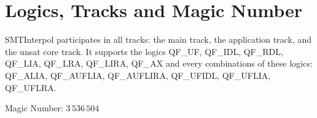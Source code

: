 \documentclass{article}
\newcommand\SI{SMTInterpol\xspace}
\begin{document}
\section*{Logics, Tracks and Magic Number}

\SI participates in all tracks: the main track, the application track,
and the unsat core track.  It supports the logics QF\_UF, QF\_IDL,
QF\_RDL, QF\_LIA, QF\_LRA, QF\_LIRA, QF\_AX and every combinations of
these logics: QF\_ALIA, QF\_AUFLIA, QF\_AUFLIRA, QF\_UFIDL, QF\_UFLIA,
QF\_UFLRA.

Magic Number: $3\,536\,504$



\end{document}
